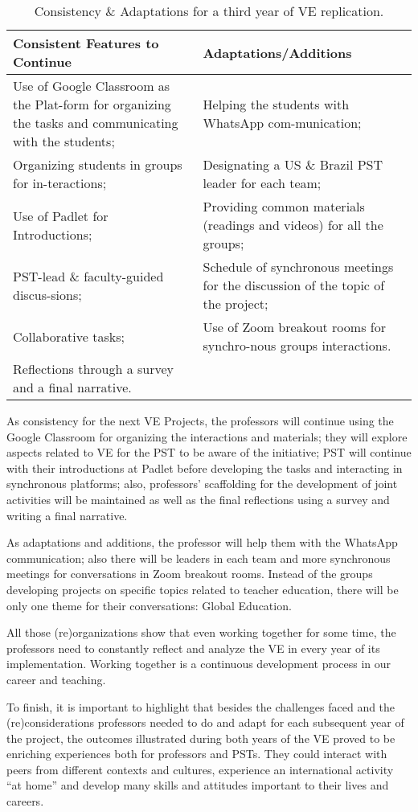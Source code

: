 \begin{table}[htpb]
\centering
\small
\setlength{\tabcolsep}{3pt}
\begin{threeparttable}
\caption{Consistency \& Adaptations for a third year of VE replication.}
\label{tab-03}
\begin{tabular}{*{2}{p{}}}
\toprule
Consistent Features to Continue & Adaptations/Additions \\
\midrule
Use of Google Classroom as the Plat-form for organizing the tasks and communicating with the students; & Helping the students with WhatsApp com-munication; \\ Organizing students in groups for in-teractions; & Designating a US \& Brazil PST leader for each team;\\
Use of Padlet for Introductions; & Providing common materials (readings and videos) for all the groups;\\ 
PST-lead \& faculty-guided discus-sions; & Schedule of synchronous meetings  for the discussion of the topic of the project;\\
Collaborative tasks; & Use of Zoom breakout rooms for synchro-nous groups interactions.\\
Reflections through a survey and a final narrative. & \\
\bottomrule		
\end{tabular}
\end{threeparttable}
\end{table}
	
As consistency for the next VE Projects, the professors will continue
using the Google Classroom for organizing the interactions and
materials; they will explore aspects related to VE for the PST to be
aware of the initiative; PST will continue with their introductions at
Padlet before developing the tasks and interacting in synchronous
platforms; also, professors' scaffolding for the development of joint
activities will be maintained as well as the final reflections using a
survey and writing a final narrative.
		
As adaptations and additions, the professor will help them with the
WhatsApp communication; also there will be leaders in each team and more
synchronous meetings for conversations in Zoom breakout rooms. Instead
of the groups developing projects on specific topics related to teacher
education, there will be only one theme for their conversations: Global
Education.
		
All those (re)organizations show that even working together for some
time, the professors need to constantly reflect and analyze the VE in
every year of its implementation. Working together is a continuous
development process in our career and teaching.
		
To finish, it is important to highlight that besides the challenges
faced and the (re)considerations professors needed to do and adapt for
each subsequent year of the project, the outcomes illustrated during
both years of the VE proved to be enriching experiences both for
professors and PSTs. They could interact with peers from different
contexts and cultures, experience an international activity \enquote{at home}
and develop many skills and attitudes important to their lives and
careers.
